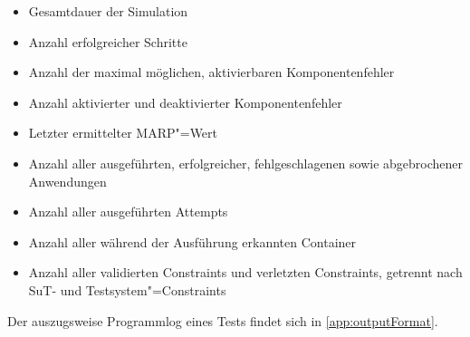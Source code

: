 \begin{itemize}
    \item Gesamtdauer der Simulation
    \item Anzahl erfolgreicher Schritte
    \item Anzahl der maximal möglichen, aktivierbaren Komponentenfehler
    \item Anzahl aktivierter und deaktivierter Komponentenfehler
    \item Letzter ermittelter \gls{MARP}"=Wert
    \item Anzahl aller ausgeführten, erfolgreicher, fehlgeschlagenen sowie abgebrochener Anwendungen
    \item Anzahl aller ausgeführten Attempts
    \item Anzahl aller während der Ausführung erkannten Container
    \item Anzahl aller validierten Constraints und verletzten Constraints, getrennt nach \gls{SuT}- und Testsystem"=Constraints
\end{itemize}

Der auszugsweise Programmlog eines Tests findet sich in \cref{app:outputFormat}.